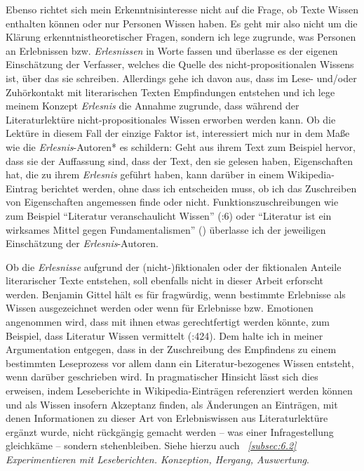 \documentclass[fontsize=12pt]{scrartcl}
\begin{document}
Ebenso richtet sich mein Erkenntnisinteresse nicht auf die Frage, ob Texte Wissen enthalten k\"onnen oder nur Per\-so\-nen Wissen haben. Es geht mir also nicht um die Kl\"arung erkenntnistheo\-retischer Fragen, sondern ich lege zugrunde, was Per\-so\-nen an Erlebnissen bzw. \textit{Erlesnissen} in Worte fassen und \"uberlasse es der eigenen Einsch\"atzung der Verfasser\textsuperscript{\tiny *}, welches die Quelle des nicht-pro\-po\-si\-ti\-o\-na\-len Wissens ist, \"uber das sie schrei\-ben. Al\-ler\-dings gehe ich davon aus, dass im Lese- und/oder Zuh\"orkontakt mit li\-te\-ra\-rischen Texten Emp\-fin\-dun\-gen entstehen und ich lege meinem Konzept \textit{Erlesnis} die Annahme zugrunde, dass w\"ahrend der Li\-te\-ra\-tur\-lekt\"ure nicht-pro\-po\-si\-ti\-o\-na\-les Wissen erworben werden kann. Ob die Lekt\"ure in diesem Fall der einzige Faktor ist, interessiert mich nur in dem Ma{\ss}e wie die \textit{Erlesnis}-Autoren* es schil\-dern: Geht aus ihrem Text zum Beispiel hervor, dass sie der Auffassung sind, dass der Text, den sie gelesen haben, Eigenschaften hat, die zu ihrem \textit{Erlesnis} gef\"uhrt haben, kann dar\"uber in einem Wi\-ki\-pe\-dia-Eintrag berichtet werden, ohne dass ich entscheiden muss, ob ich das Zuschrei\-ben von Eigenschaften angemessen finde oder nicht. Funktionszuschreibungen wie zum Beispiel "`Li\-te\-ra\-tur veranschaulicht Wissen"' (\cite{Koppe2011}:6) oder "`Li\-te\-ra\-tur ist ein wirksames Mittel gegen Fundamentalismen"' (\cite{Wertheimer2013}) \"uberlasse ich der jeweiligen Einsch\"atzung der \textit{Erlesnis}-Autoren\textsuperscript{\tiny *}.

Ob die \textit{Erlesnisse} aufgrund der (nicht-)fiktionalen oder der fiktionalen Anteile li\-te\-ra\-rischer Texte entstehen, soll ebenfalls nicht in dieser Arbeit erforscht werden. Benjamin Gittel h\"alt es f\"ur fragw\"urdig, wenn bestimmte Erlebnisse als Wissen ausge\-zeichnet werden oder wenn f\"ur Erlebnisse bzw. Emotionen angenommen wird, dass mit ihnen etwas gerechtfertigt werden k\"onnte, zum Beispiel, dass Li\-te\-ra\-tur Wissen vermittelt (\cite{Gittel2013}:424). Dem halte ich in meiner Argumentation entgegen, dass in der Zuschreibung des Empfindens zu einem bestimmten Leseprozess vor allem dann ein Li\-te\-ra\-tur-bezogenes Wissen entsteht, wenn dar\"uber geschrieben wird. In pragmatischer Hinsicht l\"asst sich dies erweisen, indem Leseberichte in Wi\-ki\-pe\-dia-Eintr\"agen re\-ferenziert werden k\"onnen und als Wissen insofern Akzeptanz finden, als \"Anderungen an Eintr\"agen, mit denen Informationen zu dieser Art von Erlebniswissen aus Li\-te\-ra\-tur\-lekt\"ure erg\"anzt wurde, nicht r\"uckg\"angig gemacht werden -- was einer Infragestellung gleichk\"ame -- sondern stehenbleiben. Sie\-he hier\-zu auch \textit{~\ref{subsec:6.2} Experimentieren mit Leseberichten. Konzeption, Hergang, Auswertung}. 
\end{document}
